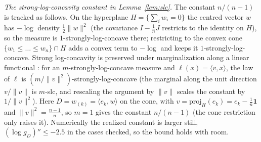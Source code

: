 \documentclass[11pt]{article}
\begin{document}
\medskip
\noindent\emph{The strong-log-concavity constant in Lemma~\ref{lem:slc}.} The constant $n/(n-1)$ is
tracked as follows. On the hyperplane $H=\{\sum_i w_i=0\}$ the centred vector $w$ has $-\log$ density
$\tfrac12\|w\|^2$ (the covariance $I-\tfrac1nJ$ restricts to the identity on $H$), so the measure is
$1$-strongly-log-concave there; restricting to the convex cone $\{w_1\le\dots\le w_n\}\cap H$ adds a
convex term to $-\log$ and keeps it $1$-strongly-log-concave. Strong log-concavity is preserved under
marginalization along a linear functional \citep{prekopa1973,brascamplieb1976,saumard2014}: for an
$m$-strongly-log-concave measure and $\ell(x)=\langle v,x\rangle$, the law of $\ell$ is
$(m/\|v\|^2)$-strongly-log-concave (the marginal along the unit direction $v/\|v\|$ is $m$-slc, and
rescaling the argument by $\|v\|$ scales the constant by $1/\|v\|^2$). Here $D=w_{(k)}=\langle e_k,w\rangle$
on the cone, with $v=\mathrm{proj}_H(e_k)=e_k-\tfrac1n\mathbf 1$ and $\|v\|^2=\tfrac{n-1}n$, so
$m=1$ gives the constant $n/(n-1)$ (the cone restriction only raises it). Numerically the realized
constant is larger still, $(\log g_D)''\le-2.5$ in the cases checked, so the bound holds with room.



\end{document}
